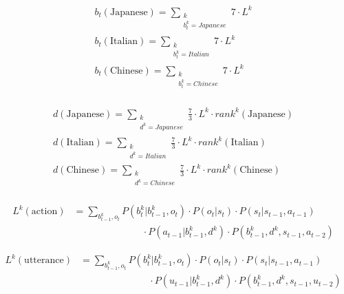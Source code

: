 \begin{equation}
  \begin{split}
  \label{b_transform}
  b_t(\mathrm{Japanese})= \sum_{\substack{k\\b_t^k=Japanese}} 7\cdot L^k\\
  b_t(\mathrm{Italian})=\sum_{\substack{k\\b_t^k=Italian}} 7\cdot L^k\\
  b_t(\mathrm{Chinese})=\sum_{\substack{k\\b_t^k=Chinese}} 7\cdot L^k\\
  \end{split}
\end{equation}

\begin{equation}
  \begin{split}
  \label{d_transform}
  d(\mathrm{Japanese})= \sum_{\substack{k\\d^k=Japanese}} \frac{7}{3}\cdot L^k \cdot rank^k({\mathrm{Japanese}})\\
  d(\mathrm{Italian})= \sum_{\substack{k\\d^k=Italian}} \frac{7}{3}\cdot L^k \cdot rank^k({\mathrm{Italian}})\\
  d(\mathrm{Chinese})= \sum_{\substack{k\\d^k=Chinese}} \frac{7}{3}\cdot L^k \cdot rank^k({\mathrm{Chinese}})\\
  \end{split}
\end{equation}

\begin{equation}
  \begin{split}
  \label{uiom_a}
  L^k({\mathrm{action}})&= \sum_{b_{t-1}^k,o_t}P(b_t^k|b_{t-1}^k,o_t)\cdot P(o_t|s_t)\cdot P(s_t|s_{t-1},a_{t-1})\\
  &\hspace{3cm}\cdot P(a_{t-1}|b_{t-1}^k,d^k)\cdot P(b_{t-1}^k,d^k,s_{t-1},a_{t-2})
  \end{split}
\end{equation}

\begin{equation}
  \begin{split}
  \label{uiom_u}
  L^k({\mathrm{utterance}})&= \sum_{b_{t-1}^k,o_t}P(b_t^k|b_{t-1}^k,o_t)\cdot P(o_t|s_t)\cdot P(s_t|s_{t-1},a_{t-1})\\
  &\hspace{3cm}\cdot P(u_{t-1}|b_{t-1}^k,d^k)\cdot P(b_{t-1}^k,d^k,s_{t-1},u_{t-2})
  \end{split}
\end{equation}


